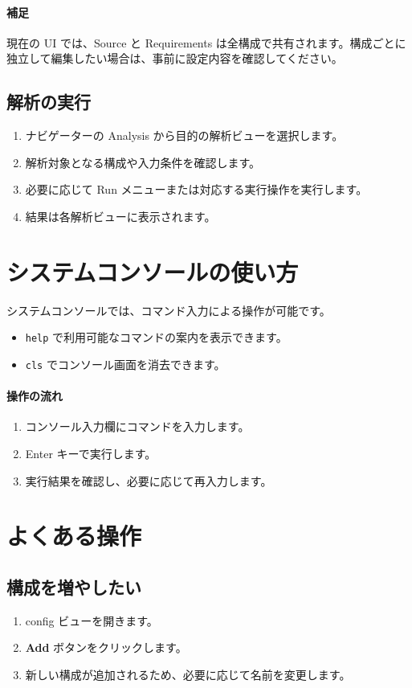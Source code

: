 \documentclass[11pt]{article}
\begin{document}
\paragraph{補足}
現在の UI では、Source と Requirements は全構成で共有されます。構成ごとに独立して編集したい場合は、事前に設定内容を確認してください。

\subsection{解析の実行}
\begin{enumerate}
  \item ナビゲーターの Analysis から目的の解析ビューを選択します。
  \item 解析対象となる構成や入力条件を確認します。
  \item 必要に応じて Run メニューまたは対応する実行操作を実行します。
  \item 結果は各解析ビューに表示されます。
\end{enumerate}

\section{システムコンソールの使い方}
システムコンソールでは、コマンド入力による操作が可能です。
\begin{itemize}
  \item \texttt{help} で利用可能なコマンドの案内を表示できます。
  \item \texttt{cls} でコンソール画面を消去できます。
\end{itemize}

\paragraph{操作の流れ}
\begin{enumerate}
  \item コンソール入力欄にコマンドを入力します。
  \item Enter キーで実行します。
  \item 実行結果を確認し、必要に応じて再入力します。
\end{enumerate}

\section{よくある操作}
\subsection{構成を増やしたい}
\begin{enumerate}
  \item config ビューを開きます。
  \item \textbf{Add} ボタンをクリックします。
  \item 新しい構成が追加されるため、必要に応じて名前を変更します。
\end{enumerate}
\end{document}
